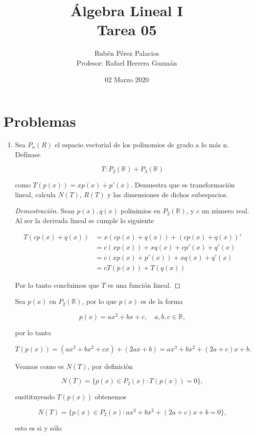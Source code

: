 \documentclass[10pt,a4paper]{article}
\title{Álgebra Lineal I\\Tarea 05}
\author{Rubén Pérez Palacios\\Profesor: Rafael Herrera Guzmán}
\date{02 Marzo 2020}
\theoremstyle{definition}
\newcommand{\R}{\mathbb{R}}
\begin{document}
\maketitle

\section*{Problemas}

\begin{enumerate}
    \item Sea $P_n(R)$ el espacio vectorial de los polinomios de grado a lo más n. Defínase
    
    \[T : P_2(\R) + P_3(\R)\]
    
    como $T(p(x)) = xp(x) + p'(x)$. Demuestra que es transformación lineal, calcula $N(T)$, $R(T)$ y las dimensiones de dichos subespacios.
    
    \begin{proof}[Demostración]
        Sean $p(x), q(x)$ polinimios en $P_2(\R)$, y $c$ un número real. Al ser la derivada lineal se cumple lo siguiente
        
        \begin{align*}
            T(cp(x) + q(x)) &= x(cp(x) + q(x)) + (cp(x) + q(x))'\\
            &= c(xp(x)) + xq(x) + cp'(x) + q'(x)\\
            &= c(xp(x) + p'(x)) + xq(x) + q'(x)\\
            &= cT(p(x)) + T(q(x))
        \end{align*}
        
        Por lo tanto concluimos que $T$ es una función lineal.
    \end{proof}

    Sea $p(x)$ en $P_2(\R)$, por lo que $p(x)$ es de la forma

    \[p(x) = ax^2 + bx + c, \quad a,b,c \in \R,\]

    por lo tanto

    \[T(p(x)) = (ax^3 + bx^2 + cx) + (2ax + b) = ax^3 + bx^2 + (2a + c)x + b.\]

    Veamos como es $N(T)$, por definición

    \[N(T) = \{p(x) \in P_2(x) : T(p(x)) = 0\},\]

    susitituyendo $T(p(x))$ obtenemos

    \[N(T) = \{p(x) \in P_2(x) : ax^3 + bx^2 + (2a+c)x + b = 0\},\]

    esto es si y sólo


\end{enumerate}
\end{document}
